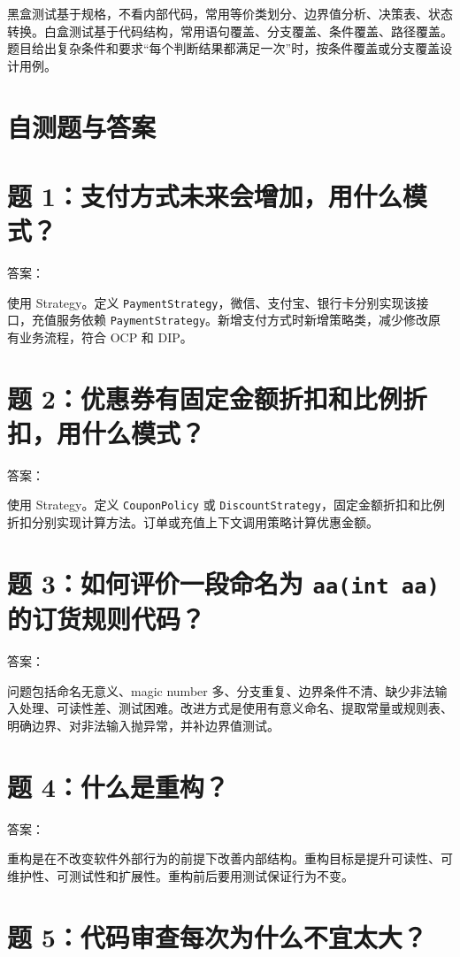 \documentclass[UTF8,zihao=-4]{ctexart}
\begin{document}
黑盒测试基于规格，不看内部代码，常用等价类划分、边界值分析、决策表、状态转换。白盒测试基于代码结构，常用语句覆盖、分支覆盖、条件覆盖、路径覆盖。题目给出复杂条件和要求“每个判断结果都满足一次”时，按条件覆盖或分支覆盖设计用例。

\section{自测题与答案}

\section{题 1：支付方式未来会增加，用什么模式？}

答案：

使用 Strategy。定义 \texttt{PaymentStrategy}，微信、支付宝、银行卡分别实现该接口，充值服务依赖 \texttt{PaymentStrategy}。新增支付方式时新增策略类，减少修改原有业务流程，符合 OCP 和 DIP。

\section{题 2：优惠券有固定金额折扣和比例折扣，用什么模式？}

答案：

使用 Strategy。定义 \texttt{CouponPolicy} 或 \texttt{DiscountStrategy}，固定金额折扣和比例折扣分别实现计算方法。订单或充值上下文调用策略计算优惠金额。

\section{题 3：如何评价一段命名为 \texttt{aa(int aa)} 的订货规则代码？}

答案：

问题包括命名无意义、magic number 多、分支重复、边界条件不清、缺少非法输入处理、可读性差、测试困难。改进方式是使用有意义命名、提取常量或规则表、明确边界、对非法输入抛异常，并补边界值测试。

\section{题 4：什么是重构？}

答案：

重构是在不改变软件外部行为的前提下改善内部结构。重构目标是提升可读性、可维护性、可测试性和扩展性。重构前后要用测试保证行为不变。

\section{题 5：代码审查每次为什么不宜太大？}
\end{document}
